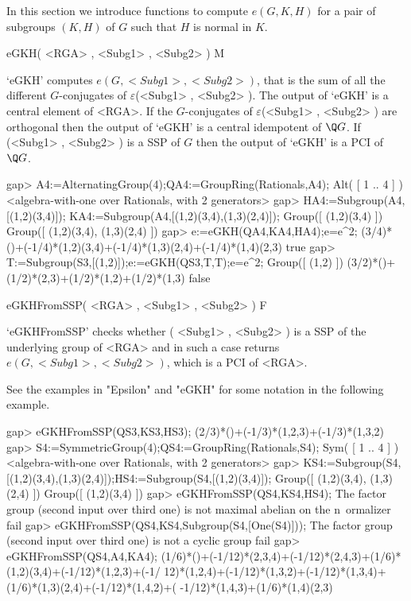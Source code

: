 
In this section we introduce functions to compute $e(G,K,H)$ for a pair of 
subgroups $(K,H)$ of $G$ such that $H$ is normal in $K$.

\>eGKH( <RGA> , <Subg1> , <Subg2> ) M

`eGKH' computes $e(G, <Subg1> , <Subg2>)$, that is the sum of all the different 
$G$-conjugates of $\varepsilon$(<Subg1> , <Subg2> ). The output of `eGKH' is a 
central element of <RGA>. If the $G$-conjugates of $\varepsilon$(<Subg1> , <Subg2> ) 
are orthogonal then the output of `eGKH' is a central idempotent of $\Q G$. If 
(<Subg1> , <Subg2> ) is a SSP of $G$ then the output of `eGKH' is a PCI of $\Q G$. 

\beginexample
    gap> A4:=AlternatingGroup(4);QA4:=GroupRing(Rationals,A4);
    Alt( [ 1 .. 4 ] )
    <algebra-with-one over Rationals, with 2 generators>
    gap> HA4:=Subgroup(A4,[(1,2)(3,4)]); KA4:=Subgroup(A4,[(1,2)(3,4),(1,3)(2,4)]);
    Group([ (1,2)(3,4) ])
    Group([ (1,2)(3,4), (1,3)(2,4) ])
    gap> e:=eGKH(QA4,KA4,HA4);e=e^2;
    (3/4)*()+(-1/4)*(1,2)(3,4)+(-1/4)*(1,3)(2,4)+(-1/4)*(1,4)(2,3)
    true
    gap> T:=Subgroup(S3,[(1,2)]);e:=eGKH(QS3,T,T);e=e^2;
    Group([ (1,2) ])
    (3/2)*()+(1/2)*(2,3)+(1/2)*(1,2)+(1/2)*(1,3)
    false
\endexample

\>eGKHFromSSP( <RGA> , <Subg1> , <Subg2> ) F

`eGKHFromSSP' checks whether ( <Subg1> , <Subg2> ) is a SSP of the underlying group of <RGA> 
and in such a case returns $e(G, <Subg1> , <Subg2>)$, which is a PCI of <RGA>. 

See the examples in "Epsilon" and "eGKH" for some notation in the following example.

\beginexample
    gap> eGKHFromSSP(QS3,KS3,HS3);
    (2/3)*()+(-1/3)*(1,2,3)+(-1/3)*(1,3,2)
    gap> S4:=SymmetricGroup(4);QS4:=GroupRing(Rationals,S4);
    Sym( [ 1 .. 4 ] )
    <algebra-with-one over Rationals, with 2 generators>
    gap> KS4:=Subgroup(S4,[(1,2)(3,4),(1,3)(2,4)]);HS4:=Subgroup(S4,[(1,2)(3,4)]);
    Group([ (1,2)(3,4), (1,3)(2,4) ])
    Group([ (1,2)(3,4) ])
    gap> eGKHFromSSP(QS4,KS4,HS4);
    The factor group (second input over third one) is not maximal abelian on the n\
    ormalizer
    fail
    gap> eGKHFromSSP(QS4,KS4,Subgroup(S4,[One(S4)])); 
    The factor group (second input over third one) is not a cyclic group 
    fail
    gap> eGKHFromSSP(QS4,A4,KA4);
    (1/6)*()+(-1/12)*(2,3,4)+(-1/12)*(2,4,3)+(1/6)*(1,2)(3,4)+(-1/12)*(1,2,3)+(-1/
    12)*(1,2,4)+(-1/12)*(1,3,2)+(-1/12)*(1,3,4)+(1/6)*(1,3)(2,4)+(-1/12)*(1,4,2)+(
    -1/12)*(1,4,3)+(1/6)*(1,4)(2,3)
\endexample



